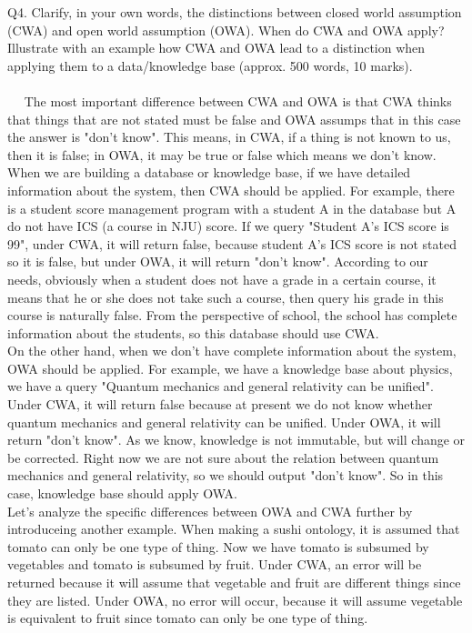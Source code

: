 \documentclass{article}
\begin{document}
Q4. Clarify, in your own words, the distinctions between closed world assumption (CWA) and open world assumption (OWA). When do CWA and OWA apply? Illustrate with an example how CWA and OWA lead to a distinction when applying them to a data/knowledge base (approx. 500 words, 10 marks).\\\\
  $\quad$ The most important difference between CWA and OWA is that CWA thinks that things that are not stated must be false and OWA assumps that in this case the answer is "don't know". This means, in CWA, if a thing is not known to us, then it is false; in OWA, it may be true or false which means we don't know.
   \\
 When we are building a database or knowledge base, if we have detailed information about the system, then CWA should be applied. For example, there is a student score management program with a student A in the database but A do not have ICS (a course in NJU) score. If we query "Student A's ICS score is 99", under CWA, it will return false, because student A's ICS score is not stated so it is false, but under OWA, it will return "don't know". According to our needs, obviously when a student does not have a grade in a certain course, it means that he or she does not take such a course, then query his grade in this course is naturally false. From the perspective of school, the school has complete information about the students, so this database should use CWA. \\
  On the other hand, when we don't have complete information about the system, OWA should be applied. For example, we have a knowledge base about physics, we have a query "Quantum mechanics and general relativity can be unified". Under CWA, it will return false because at present we do not know whether quantum mechanics and general relativity can be unified. Under OWA, it will return "don't know". As we know, knowledge is not immutable, but will change or be corrected. Right now we are not sure about the relation between quantum mechanics and general relativity, so we should output "don't know". So in this case, knowledge base should apply OWA. \\
  Let's analyze the specific differences between OWA and CWA further by introduceing another example. When making a sushi ontology, it is assumed that tomato can only be one type of thing. Now we have tomato is subsumed by vegetables and tomato is subsumed by fruit. Under CWA, an error will be returned because it will assume that vegetable and fruit are different things since they are listed. Under OWA, no error will occur, because it will assume vegetable is equivalent to fruit since tomato can only be one type of thing.
\end{document}
